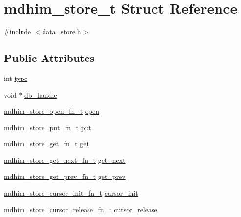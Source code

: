 \hypertarget{structmdhim__store__t}{\section{mdhim\-\_\-store\-\_\-t Struct Reference}
\label{d1/dab/structmdhim__store__t}
}


{\ttfamily \#include $<$data\-\_\-store.\-h$>$}

\subsection*{Public Attributes}
\begin{DoxyCompactItemize}
\item 
int \hyperlink{structmdhim__store__t_a00f8694bd01cc8cfda7479b7384e083b}{type}
\item 
void $\ast$ \hyperlink{structmdhim__store__t_ab9c004b5de88a17f058146ef0a91e696}{db\-\_\-handle}
\item 
\hyperlink{data__store_8h_af26a1cac009a37a5d7f0ac20ee19fc61}{mdhim\-\_\-store\-\_\-open\-\_\-fn\-\_\-t} \hyperlink{structmdhim__store__t_a8d77b86eb31d677f36b46f653865ea1d}{open}
\item 
\hyperlink{data__store_8h_a53be65de68e4f03efc8816cdd2ce65b8}{mdhim\-\_\-store\-\_\-put\-\_\-fn\-\_\-t} \hyperlink{structmdhim__store__t_a5a33c9ea5897fdf71a54573ea49fef18}{put}
\item 
\hyperlink{data__store_8h_a39ec0bff4eb89b9081fdaaa94700766f}{mdhim\-\_\-store\-\_\-get\-\_\-fn\-\_\-t} \hyperlink{structmdhim__store__t_a6ad0450519e040a4ae11631aa6202b24}{get}
\item 
\hyperlink{data__store_8h_ae7b10d7cbd8818f21da6d573aca3b9a5}{mdhim\-\_\-store\-\_\-get\-\_\-next\-\_\-fn\-\_\-t} \hyperlink{structmdhim__store__t_a0e42f0e911de2adb2616228f3ffbfd99}{get\-\_\-next}
\item 
\hyperlink{data__store_8h_a2ee5c86262bb132c24a144766cf5bef8}{mdhim\-\_\-store\-\_\-get\-\_\-prev\-\_\-fn\-\_\-t} \hyperlink{structmdhim__store__t_a43c5445119b911e3da419f26c5aae232}{get\-\_\-prev}
\item 
\hyperlink{data__store_8h_a987c504ec34ab0559d95d014034a2585}{mdhim\-\_\-store\-\_\-cursor\-\_\-init\-\_\-fn\-\_\-t} \hyperlink{structmdhim__store__t_ade2a566d298ab48a666cf2cfdec58f25}{cursor\-\_\-init}
\item 
\hyperlink{data__store_8h_a7c97bfb9cd30831f1ab1dbdfd9aa25e0}{mdhim\-\_\-store\-\_\-cursor\-\_\-release\-\_\-fn\-\_\-t} \hyperlink{structmdhim__store__t_a36a8838ceb12bd2d454f7930e52ccaa2}{cursor\-\_\-release}

\end{DoxyCompactItemize}
